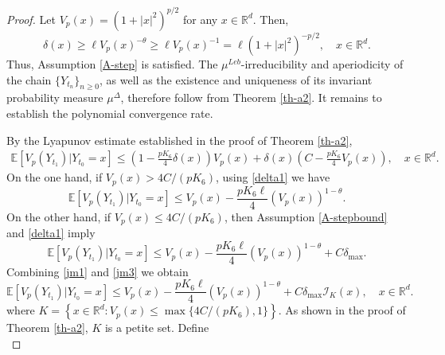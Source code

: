 \documentclass[preprint,12pt,compress]{elsarticle}
\begin{document}
\begin{proof}
Let $V_p(x) = {\left( {1 + {{\left| x \right|}^2}} \right)^{p/2}}$ for any $x \in \mathbb{R}^d$. Then, 
\begin{equation*}
	\delta (x) \ge \ell {V_p}{(x)^{ - \theta }} \ge \ell {V_p}{(x)^{ - 1}} = \ell {\left( {1 + {{\left| x \right|}^2}} \right)^{ - p/2}}, \quad x \in \mathbb{R}^d.
\end{equation*}
Thus, Assumption \ref{A-step} is satisfied. The $\mu^{Leb}$-irreducibility and aperiodicity of the chain ${\{ {Y_{{t_n}}}\} _{n \ge 0}}$, as well as the existence and uniqueness of its invariant probability measure $\mu^\Delta$, therefore follow from Theorem \ref{th-a2}. It remains to establish the polynomial convergence rate.

By the Lyapunov estimate established in the proof of Theorem \ref{th-a2}, 
\begin{equation*}
	\begin{split}
		\mathbb{E}\left[ {V_p({Y_{{t_{1}}}})|{Y_{{t_0}}} = x} \right] \le \left( {1 - \frac{{pK_6 }}{4}}\delta (x) \right)V_p(x) + \delta (x)\left( {C - \frac{pK_6 }{4}V_p(x)} \right), \quad  x \in \mathbb{R}^d.
	\end{split}
\end{equation*}
On the one hand, if $V_p(x) > 4C/(pK_6) $, using \eqref{delta1} we have
\begin{equation}  \label{jm1}	
	\mathbb{E}\left[ {{V_p}({Y_{{t_{1}}}})|{Y_{{t_0}}} = x} \right] \le {V_p}(x) - \frac{{p{K_6}\ell }}{4}{\left( {{V_p}(x)} \right)^{1 - \theta }}.
\end{equation}
On the other hand, if $V_p(x) \le 4C/(pK_6) $, then Assumption \ref{A-stepbound} and \eqref{delta1} imply
\begin{equation}	\label{jm3}
	\mathbb{E}\left[ {V_p({Y_{{t_{1 }}}})|{Y_{{t_0}}} = x} \right] \le V_p (x) - \frac{{p{K_6}\ell }}{4}{\left( {{V_p}(x)} \right)^{1 - \theta }} + C\delta_{\max}.
\end{equation}
Combining \eqref{jm1} and \eqref{jm3} we obtain
\begin{equation}  \label{jm5}
	\mathbb{E}\left[ {V_p({Y_{{t_{ 1}}}})|{Y_{{t_0}}} = x} \right] \le V_p(x) - \frac{{p{K_6}\ell }}{4}{\left( {{V_p}(x)} \right)^{1 - \theta }} + C{\delta _{\max }}{\mathcal{I}_K}(x), \quad x\in \mathbb{R}^d.
\end{equation}
where $K = \left\{ {x \in {\mathbb{R}^d}:V_p(x) \le \max \{4C/(pK_6), 1\} } \right\}$. As shown in the proof of Theorem \ref{th-a2}, $K$ is a petite set.
Define 
\begin{equation*}

\end{equation*}
\end{proof}
\end{document}
